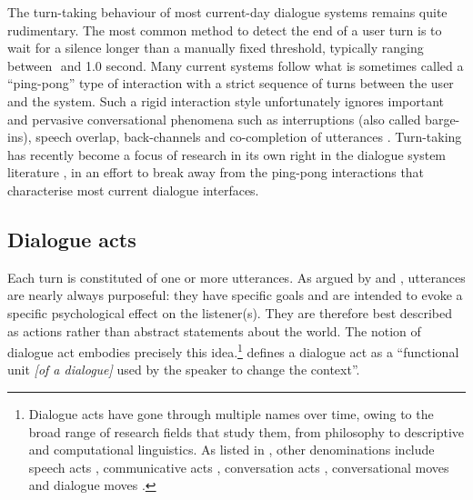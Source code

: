 The turn-taking behaviour of most current-day dialogue systems remains quite rudimentary.  The most common method to detect the end of a user turn is to wait for a silence longer than a manually fixed threshold, typically ranging between 
\textonehalf  $ $ and 1.0 second. Many current systems follow what is sometimes called a ``ping-pong'' type of interaction with a strict sequence of turns between the user and the system. Such a rigid interaction style unfortunately ignores important and pervasive conversational phenomena such as interruptions (also called barge-ins), speech overlap, back-channels and co-completion of utterances \citep{StromS00,baumann2013:phd}. Turn-taking has recently become a focus of research in its own right in the dialogue system literature \citep{RauxE09,Gravano2011}, in an effort to break away from the ping-pong interactions that characterise most current dialogue interfaces. 


\subsection{Dialogue acts}

Each turn is constituted of one or more utterances.  As argued by \cite{Austin1962} and \cite{Searle1969}, utterances are nearly always purposeful: they have specific goals and are intended to evoke a specific psychological effect on the listener(s).  They are therefore best described as actions rather than abstract statements about the world.  The notion of dialogue act embodies precisely this idea.\footnote{Dialogue acts have gone through multiple names over time, owing to the broad range of research fields that study them, from philosophy to descriptive and computational linguistics.  As listed in \cite{mctear2004}, other denominations include speech acts \citep{Searle1969}, communicative acts \citep{allwood1976}, conversation acts \citep{TraumH92}, conversational moves \citep{sinclair1975} and dialogue moves \citep{Larsson:2000}.} \cite[][p.~5]{Bunt1996} defines a dialogue act as a ``functional unit \textit{[of a dialogue]} used by the speaker to change the context''.  

